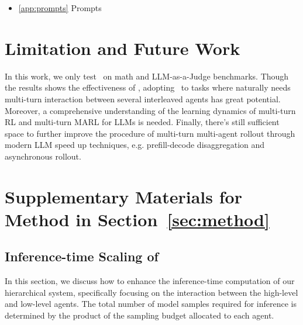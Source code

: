 \begin{itemize}
\begin{itemize}
        \item \ref{app:qualative_results.case_study} Case study for Experiments of Different Reward Functions in Appendix~\ref{exp:reward_design} \dotfill \pageref{app:qualative_results.case_study}
        \item \ref{app:qualative_results.case_study.json} Case study for Adaptive Meta-thinking in Single-Turn \method~in Section~\ref{sec:exp.high_rl} \dotfill \pageref{app:qualative_results.case_study.json}
    \end{itemize}
    \item \ref{app:prompts} Prompts \dotfill \pageref{app:prompts}
\end{itemize}



\section{Limitation and Future Work}
\label{sec:limitation_and_future_work}
In this work, we only test \method~on math and LLM-as-a-Judge benchmarks. Though the results shows the effectiveness of \method, adopting \method~to tasks where naturally needs multi-turn interaction between several interleaved agents has great potential.
Moreover, a comprehensive understanding of the learning dynamics of multi-turn RL and multi-turn MARL for LLMs is needed. 
Finally, there's still sufficient space to further improve the procedure of multi-turn multi-agent rollout through modern LLM speed up techniques, e.g. prefill-decode disaggregation and asynchronous rollout.

\section{Supplementary Materials for Method in Section~\ref{sec:method}}
\label{app:suppl_method}
\subsection{Inference-time Scaling of \method}
\label{sec:appx.reinforce_ma.infer_scaling}

In this section, we discuss how to enhance the inference-time computation of our hierarchical system, specifically focusing on the interaction between the high-level and low-level agents. The total number of model samples required for inference is determined by the product of the sampling budget allocated to each agent. 

